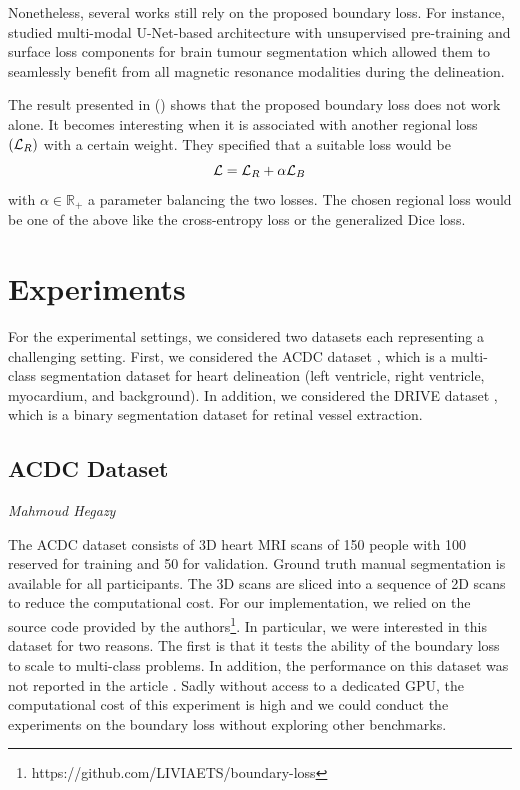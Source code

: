 \documentclass[onecolumn]{article}
\begin{document}
Nonetheless, several works still rely on the proposed boundary loss. For instance, \cite{ribalta_lorenzo_multi-modal_2020} studied multi-modal U-Net-based architecture with unsupervised pre-training and surface loss components for brain tumour segmentation which allowed them to seamlessly benefit from all magnetic resonance modalities during the delineation.  

The result presented in (\cite{kervadec_boundary_2021}) shows that the proposed boundary loss does not work alone. It becomes interesting when it is associated with another regional loss $(\mathcal{L}_{R})$ with a certain weight. They specified that a suitable loss would be
\begin{equation}
    \mathcal{L} = \mathcal{L}_{R} + \alpha\mathcal{L}_{B}
\end{equation}
with $\alpha\in\mathbb{R}_+$ a parameter balancing the two losses. The chosen regional loss would be one of the above like the cross-entropy loss or the generalized Dice loss.


\section{Experiments}
For the experimental settings, we considered two datasets each representing a challenging setting. First, we considered the ACDC dataset \citep{bernard2018deep}, which is a multi-class segmentation dataset for heart delineation (left ventricle, right ventricle, myocardium, and background). In addition, we considered the DRIVE dataset \citep{staal2004ridge}, which is a binary segmentation dataset for retinal vessel extraction.


\subsection{ACDC Dataset}
\textit{Mahmoud Hegazy}


The ACDC dataset consists of 3D heart MRI scans of 150 people with 100 reserved for training and 50 for validation. Ground truth manual segmentation is available for all participants. The 3D scans are sliced into a sequence of 2D scans to reduce the computational cost.  For our implementation, we relied on the source code provided by the authors\footnote{https://github.com/LIVIAETS/boundary-loss}. In particular, we were interested in this dataset for two reasons. The first is that it tests the ability of the boundary loss to scale to multi-class problems. In addition, the performance on this dataset was not reported in the article \cite{kervadec_boundary_2021}. Sadly without access to a dedicated GPU, the computational cost of this experiment is high and we could conduct the experiments on the boundary loss without exploring other benchmarks.
\end{document}
